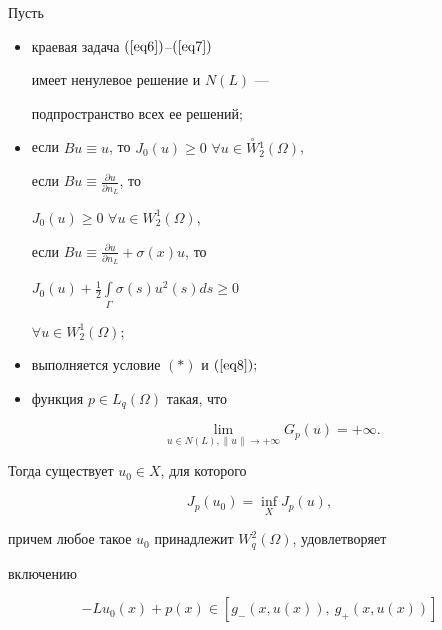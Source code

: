 \begin{thms}


Пусть


\begin{itemize}


\item[1)] краевая задача $(\ref{eq6})$--$(\ref{eq7})$


имеет ненулевое решение и $N(L)$ ---


подпространство всех ее решений\/$;$


\item[2)] если $Bu\equiv u$, то $J_0(u)\ge 0$ $\forall u\in


\overset{\circ}{W}{}_{2}^{1}(\Omega)$,


если $ Bu\equiv \frac{\partial u}{\partial n_L} $, то 


$J_0(u)\ge 0$ $\forall u\in W_{2}^{1}(\Omega)$,


если $Bu \equiv \frac{\partial u}{\partial n_L} + \sigma (x)u$, то 


$J_0(u)+\frac12\int\limits_{\Gamma } \sigma (s)u^2(s)ds \ge 0$


$\forall u\in W_{2}^{1}(\Omega);$


\item[3)] выполняется условие $(*)$ и $(\ref{eq8});$


\item[4)] функция $p\in L_q(\Omega )$ такая, что


\begin{equation}


\lim\limits_{u\in N(L),\| u\| \to +\infty } G_p(u)=+\infty.


\label{eq1.9}


\end{equation}


\end{itemize}


Тогда существует $u_0\in X $, для которого


\begin{equation}


J_p(u_0)=\inf\limits_X J_p(u), \label{eq1.10}


\end{equation}


причем любое такое $u_0$ принадлежит $W_{q}^{2}(\Omega ) $, удовлетворяет


включению


\begin{equation}


-Lu_0(x)+p(x)\in [g_{-}(x,u(x)),\ g_{+}(x,u(x))] \label{eq1.11}



\end{equation}
\end{thms}
